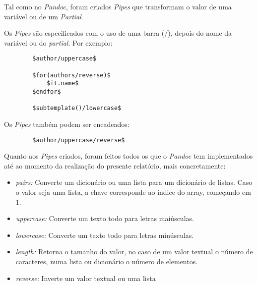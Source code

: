 \documentclass[../relatorio.tex]{subfiles}
\begin{document}
    Tal como no \textit{Pandoc}, foram criados \textit{Pipes}
    que transformam o valor de uma variável ou de um \textit{Partial}.

    Os \textit{Pipes} são especificados com o uso de uma barra (/), 
    depois do nome da variável ou do \textit{partial}. Por exemplo:

    \begin{verbatim}
        $author/uppercase$

        $for(authors/reverse)$
            $it.name$
        $endfor$

        $subtemplate()/lowercase$
    \end{verbatim}

    Os \textit{Pipes} também podem ser encadeados:
    \begin{verbatim}
        $author/uppercase/reverse$
    \end{verbatim}
    
    Quanto aos \textit{Pipes} criados, foram feitos todos os que o
    \textit{Pandoc} tem implementados até ao momento da realização
    do presente relatório, mais concretamente:

    \begin{itemize}
        \item \textit{pairs: }Converte um dicionário ou uma lista
        para um dicionário de listas. Caso o valor seja uma lista,
        a chave corresponde ao índice do array, começando em 1.
        \item \textit{uppercase: }Converte um texto todo para
        letras maiúsculas.
        \item \textit{lowercase: }Converte um texto todo para
        letras minúsculas.
        \item \textit{length: }Retorna o tamanho do valor, no 
        caso de um valor textual o número de caracteres, numa
        lista ou dicionário o número de elementos.
        \item \textit{reverse: }Inverte um valor textual ou uma
        lista
    \end{itemize}
\end{document}
